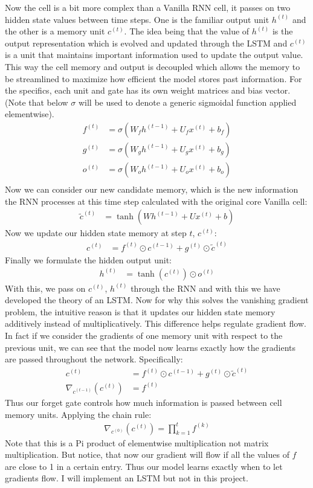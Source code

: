 \documentclass[12pt]{article}
\begin{document}
Now the cell is a bit more complex than a Vanilla RNN cell, it passes on two hidden state values between time steps.
One is the familiar output unit $h^{(t)}$ and the other is a memory unit $c^{(t)}$. The idea being
that the value of $h^{(t)}$ is the output representation which is evolved and updated through the LSTM and
$c^{(t)}$ is a unit that maintains important information used to update the output value. This way the cell
memory and output is decoupled which allows the memory to be streamlined to maximize how efficient the model
stores past information. For the specifics, each unit and gate has its own weight matrices and bias vector. (Note
that below $\sigma$ will be used to denote a generic sigmoidal function applied elementwise).
\begin{align*}
    f^{(t)} &= \sigma(W_fh^{(t-1)} + U_fx^{(t)} + b_f) \\
    g^{(t)} &= \sigma(W_gh^{(t-1)} + U_gx^{(t)} + b_g) \\
    o^{(t)} &=\sigma(W_oh^{(t-1)} + U_ox^{(t)} + b_o) \\
\end{align*}
Now we can consider our new candidate memory, which is the new information the RNN processes at this time
step calculated with the original core Vanilla cell:
\begin{align*}
    \tilde{c}^{(t)} &=  \tanh(Wh^{(t-1)} + Ux^{(t)} + b)
\end{align*}
Now we update our hidden state memory at step $t$, $c^{(t)}$:
\begin{align*}
    c^{(t)} &= f^{(t)} \odot c^{(t-1)} + g^{(t)} \odot \tilde{c}^{(t)}
\end{align*}
Finally we formulate the hidden output unit:
\begin{align*}
    h^{(t)} &= \tanh(c^{(t)}) \odot o^{(t)}
\end{align*}
With this, we pass on $c^{(t)}$, $h^{(t)}$ through the RNN and with this we have developed the theory of an LSTM.
Now for why this solves the vanishing gradient problem, the intuitive reason is that it updates our hidden state
memory additively instead of multiplicatively. This difference helps regulate gradient flow. In fact if we consider
the gradients of one memory unit with respect to the previous unit, we can see that the model now learns
exactly how the gradients are passed throughout the network. Specifically:
\begin{align*}
    c^{(t)} &= f^{(t)} \odot c^{(t-1)} + g^{(t)} \odot \tilde{c}^{(t)} \\
    \nabla_{c^{(t-1)}}(c^{(t)}) &= f^{(t)}
\end{align*}
Thus our forget gate controls how much information is passed between cell memory units. Applying the chain rule:
\begin{align*}
     \nabla_{c^{(0)}}(c^{(t)}) = \prod_{k=1}^{t}f^{(k)}
\end{align*}
Note that this is a Pi product of elementwise multiplication not matrix multiplication. But notice, that
now our gradient will flow if all the values of $f$ are close to 1 in a certain entry. Thus our model learns
exactly when to let gradients flow. I will implement an LSTM but not in this project.
\end{document}
